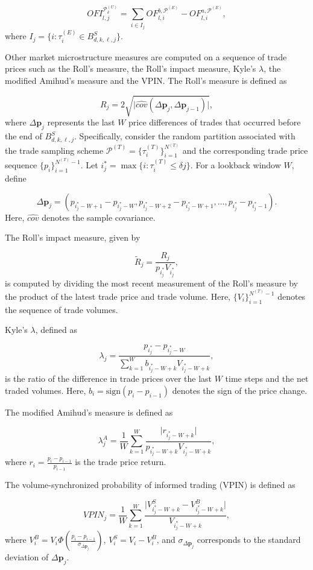 \documentclass[10pt,a4paper,oneside]{article}
\begin{document}
$$
    OFI^{\mathcal{P}^{(U)}_{\delta}}_{l, j} = \sum_{i \in I_j} OF^{b, \mathcal{P}^{(E)}}_{l,i} - OF^{a, \mathcal{P}^{(E)}}_{l,i},
$$
where $I_j = \{ i : \tau^{(E)}_i \in B^S_{d,k,\ell,j} \}$.

Other market microstructure measures are computed on a sequence of trade prices such as the Roll's measure, the Roll's impact measure, Kyle's $\lambda$, the modified Amihud's measure and the VPIN. The Roll’s measure is defined as

\[
    R_j = 2 \sqrt{\Big| \hat{cov}(\Delta \mathbf{p}_j, \Delta \mathbf{p}_{j - 1}) \Big|},
\]
where \(\Delta \mathbf{p}_j\) represents the last \(W\) price differences of trades that occurred before the end of $B^S_{d,k,\ell,j}$. Specifically, consider the random partition associated with the trade sampling scheme \(\mathcal{P}^{(T)} = \{ \tau^{(T)}_i \}_{i=1}^{N^{(T)}}\) and the corresponding trade price sequence \(\{p_i\}_{i=1}^{N^{(T)}-1}\). Let \(i^*_j = \max\{i : \tau^{(T)}_i \leq \delta j\}\). For a lookback window \(W\), define

\[
    \Delta \mathbf{p}_j = (p_{i^*_j - W + 1} - p_{i^*_j - W}, p_{i^*_j - W + 2} - p_{i^*_j - W + 1}, \dots, p_{i^*_j} - p_{i^*_j - 1}).
\]
Here, \(\hat{cov}\) denotes the sample covariance.

The Roll’s impact measure, given by

\[
    \tilde{R}_j = \frac{R_j}{p_{i^*_j} V_{i^*_j}},
\]
is computed by dividing the most recent measurement of the Roll’s measure by the product of the latest trade price and trade volume. Here, \(\{ V_i \}_{i=1}^{N^{(T)}-1}\) denotes the sequence of trade volumes.

Kyle’s \(\lambda\), defined as

\[
    \lambda_j = \frac{p_{i^*_j} - p_{i^*_j - W}}{\sum_{k=1}^W b_{i^*_j - W + k} V_{i^*_j - W + k}},
\]
is the ratio of the difference in trade prices over the last \(W\) time steps and the net traded volumes. Here, \(b_i = \text{sign}(p_i - p_{i-1})\) denotes the sign of the price change.

The modified Amihud’s measure is defined as

\[
    \lambda^A_j = \frac{1}{W} \sum_{k=1}^W \frac{\big| r_{i^*_j - W + k} \big|}{p_{i^*_j - W + k} V_{i^*_j - W + k}},
\]
where \(r_i = \frac{p_i - p_{i-1}}{p_{i-1}}\) is the trade price return.

The volume-synchronized probability of informed trading (VPIN) is defined as

\[
    VPIN_j = \frac{1}{W} \sum_{k=1}^W \frac{\big| V_{i^*_j - W + k}^S - V_{i^*_j - W + k}^B \big|}{V_{i^*_j - W + k}},
\]
where \(V^B_i = V_i \Phi \left( \frac{p_i - p_{i-1}}{\sigma_{\Delta \mathbf{p}_j}} \right)\), \(V^S_i = V_i - V^B_i\), and \(\sigma_{\Delta \mathbf{p}_j}\) corresponds to the standard deviation of \(\Delta \mathbf{p}_j\).
\end{document}
